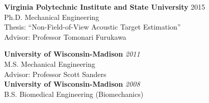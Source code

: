 \documentclass[12pt,letterpaper]{article}
\begin{document}
\begin{center}
\begin{minipage}{0.55\columnwidth}
{\bf Virginia Polytechnic Institute and State University}\hspace{1mm} 2015\\
\hspace{2mm}Ph.D.  Mechanical Engineering  \\ 
\hspace{4mm} Thesis: ``Non-Field-of-View Acoustic Target Estimation''\\
\hspace{28mm} Advisor: Professor Tomonari Furukawa
\end{minipage}
\hfill
\begin{minipage}{0.44\columnwidth}
{\bf University of Wisconsin-Madison} \hfill {\em2011} \\ 
\hspace{5mm} M.S. Mechanical Engineering \\
\hspace{10mm} Advisor: Professor Scott Sanders\\
{\bf University of Wisconsin-Madison} \hfill {\em2008} \\ 
\hspace{5mm}B.S. Biomedical Engineering (Biomechanics)
\end{minipage}
\end{center}
\vspace{-8mm}
\end{document}
